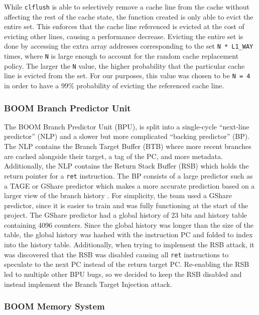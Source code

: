While {\tt clflush} is able to selectively remove a cache line from the cache without 
affecting the rest of the cache state, the function created is only able to evict the entire set.
This enforces that the cache line referenced is evicted at the cost of evicting other lines, causing a performance
decrease. Evicting the entire set is done by accessing the extra array addresses corresponding to the set 
{\tt N * L1\_WAY} times, where {\tt N} is large enough to account for the random cache replacement policy. The larger
the {\tt N} value, the higher probability that the particular cache line is evicted from the set. For our purposes, this value
was chosen to be {\tt N = 4} in order to have a 99\% probability of evicting the referenced cache line.

\subsubsection{BOOM Branch Predictor Unit}


The BOOM Branch Predictor Unit (BPU), is split into a single-cycle ``next-line predictor'' (NLP) and a
slower but more complicated ``backing predictor'' (BP). The NLP contains the Branch Target Buffer (BTB) 
where more recent branches are cached alongside their target, a tag of the PC, and more metadata. Additionally,
the NLP contains the Return Stack Buffer (RSB) which holds the return pointer for a {\tt ret} instruction. The BP
consists of a large predictor such as a TAGE or GShare predictor which makes a more accurate prediction based on
a larger view of the branch history \cite{b47}. For simplicity, the team used a GShare predictor, since it is 
easier to train and was fully functioning at the start of the project. The GShare predictor had a global history of 23 bits and history table containing 4096 
counters. Since the global history was longer than the size of the table, the global history was hashed with the 
instruction PC and folded to index into the history table. Additionally, when trying to
implement the RSB attack, it was discovered that the RSB was disabled causing all {\tt ret} instructions
to speculate to the next PC instead of the return target PC. Re-enabling the RSB led to multiple other BPU bugs,
so we decided to keep the RSB disabled and instead implement the Branch Target Injection attack.

\subsubsection{BOOM Memory System}


